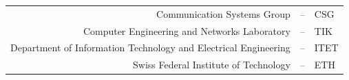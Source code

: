 \begin{titlepage}
	\vspace{8mm} 
	\raggedleft 
	\begin{tabular}
		{rcl} Communication Systems Group&--&
		CSG\\
		Computer Engineering and Networks Laboratory&--&TIK\\
		Department of
		Information Technology and Electrical Engineering&--&ITET\\
		Swiss Federal
		Institute of Technology&--&ETH\\
	\end{tabular}
\end{titlepage}